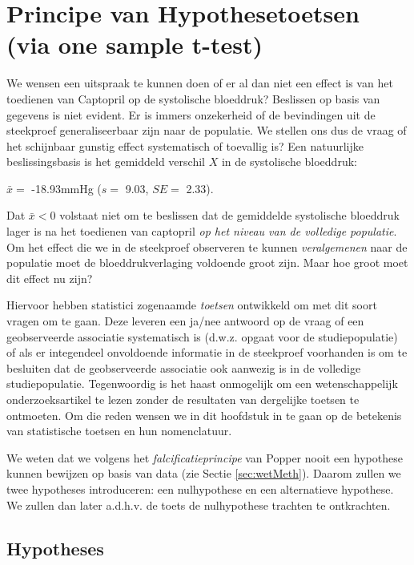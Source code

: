 \documentclass[12pt,dutch,coursenotes]{book}
\theoremstyle{definition}
\theoremstyle{definition}
\theoremstyle{definition}
\theoremstyle{remark}
\begin{document}
\section{Principe van Hypothesetoetsen (via one sample
t-test)}\label{principe-van-hypothesetoetsen-via-one-sample-t-test}

We wensen een uitspraak te kunnen doen of er al dan niet een effect is
van het toedienen van Captopril op de systolische bloeddruk? Beslissen
op basis van gegevens is niet evident. Er is immers onzekerheid of de
bevindingen uit de steekproef generaliseerbaar zijn naar de populatie.
We stellen ons dus de vraag of het schijnbaar gunstig effect
systematisch of toevallig is? Een natuurlijke beslissingsbasis is het
gemiddeld verschil \(X\) in de systolische bloeddruk:

\(\bar x=\) -18.93mmHg (\(s =\) 9.03, \(SE =\) 2.33).

Dat \(\bar{x}< 0\) volstaat niet om te beslissen dat de gemiddelde
systolische bloeddruk lager is na het toedienen van captopril \emph{op
het niveau van de volledige populatie}. Om het effect die we in de
steekproef observeren te kunnen \emph{veralgemenen} naar de populatie
moet de bloeddrukverlaging voldoende groot zijn. Maar hoe groot moet dit
effect nu zijn?

Hiervoor hebben statistici zogenaamde \emph{toetsen} ontwikkeld om met
dit soort vragen om te gaan. Deze leveren een ja/nee antwoord op de
vraag of een geobserveerde associatie systematisch is (d.w.z. opgaat
voor de studiepopulatie) of als er integendeel onvoldoende informatie in
de steekproef voorhanden is om te besluiten dat de geobserveerde
associatie ook aanwezig is in de volledige studiepopulatie. Tegenwoordig
is het haast onmogelijk om een wetenschappelijk onderzoeksartikel te
lezen zonder de resultaten van dergelijke toetsen te ontmoeten. Om die
reden wensen we in dit hoofdstuk in te gaan op de betekenis van
statistische toetsen en hun nomenclatuur.

We weten dat we volgens het \emph{falcificatieprincipe} van Popper nooit
een hypothese kunnen bewijzen op basis van data (zie Sectie
\ref{sec:wetMeth}). Daarom zullen we twee hypotheses introduceren: een
nulhypothese en een alternatieve hypothese. We zullen dan later a.d.h.v.
de toets de nulhypothese trachten te ontkrachten.

\subsection{Hypotheses}\label{hypotheses}
\end{document}
